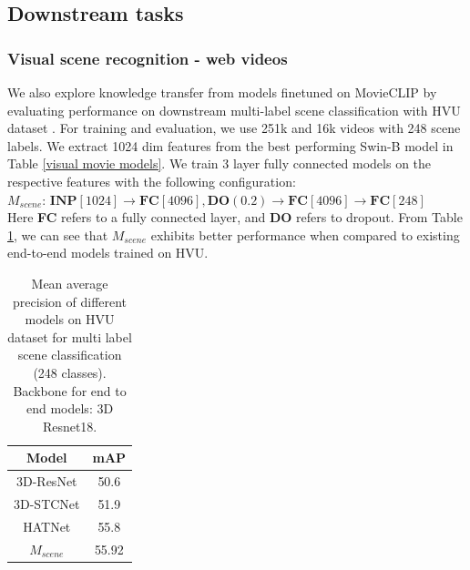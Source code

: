 \subsection{Downstream tasks}
\subsubsection{Visual scene recognition - web videos}
We also explore knowledge transfer from models finetuned on MovieCLIP by evaluating performance on downstream multi-label scene classification with HVU dataset \cite{diba_large_2020}. For training and evaluation, we use 251k and 16k videos with 248 scene labels. We extract 1024 dim features from the best performing Swin-B model in Table \ref{visual movie models}.
We train 3 layer fully connected models on the respective features with the following configuration:\\
\textit{$M_{scene}$}: $\textbf{INP}[1024]\rightarrow{}\textbf{FC}[4096],\textbf{DO}(0.2)
\rightarrow{}\textbf{FC}[4096] \rightarrow{}\textbf{FC}[248]$\\
Here \textbf{FC} refers to a fully connected layer, and \textbf{DO} refers to dropout.
From Table \ref{HVU}, we can see that ${M_{scene}}$ exhibits better performance when compared to existing end-to-end models trained on HVU.
\begin{table}[h!]
\centering
\begin{tabular}{|c|c|}
\hline
\textbf{Model}                                     & \textbf{mAP} \\ \hline
3D-ResNet \cite{diba_large_2020}                                &   50.6  \\ \hline 
3D-STCNet  \cite{diba_large_2020}                            &  51.9   \\ \hline
HATNet  \cite{diba_large_2020}                              &  55.8   \\ \hline
${M_{scene}}$ &  55.92   \\ \hline
\end{tabular}
\vspace{5mm}
\caption{Mean average precision of different models on HVU dataset for multi label scene classification (248 classes). Backbone for end to end models: 3D Resnet18.}
\label{HVU}
\end{table}
